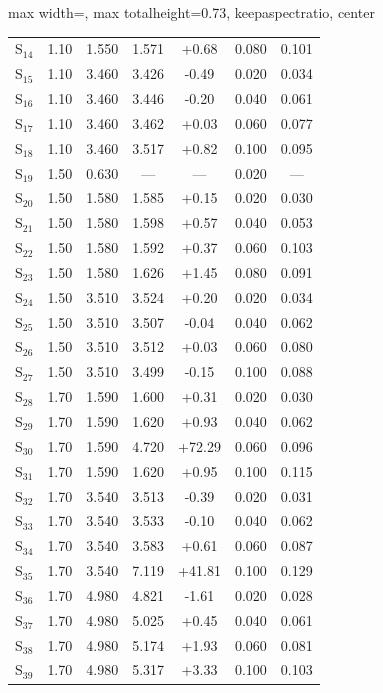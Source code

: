 \begin{adjustbox}{
max width=\textwidth,
max totalheight=0.73\textheight,
keepaspectratio,
center
}
\begin{tabular}{@{}c c c c c c c@{}}
S$_{14}$ & 1.10 & 1.550 & 1.571 & +0.68 & 0.080 & 0.101 \\
S$_{15}$ & 1.10 & 3.460 & 3.426 & -0.49 & 0.020 & 0.034 \\
S$_{16}$ & 1.10 & 3.460 & 3.446 & -0.20 & 0.040 & 0.061 \\
S$_{17}$ & 1.10 & 3.460 & 3.462 & +0.03 & 0.060 & 0.077 \\
S$_{18}$ & 1.10 & 3.460 & 3.517 & +0.82 & 0.100 & 0.095 \\
S$_{19}$ & 1.50 & 0.630 & --- & --- & 0.020 & --- \\
S$_{20}$ & 1.50 & 1.580 & 1.585 & +0.15 & 0.020 & 0.030 \\
S$_{21}$ & 1.50 & 1.580 & 1.598 & +0.57 & 0.040 & 0.053 \\
S$_{22}$ & 1.50 & 1.580 & 1.592 & +0.37 & 0.060 & 0.103 \\
S$_{23}$ & 1.50 & 1.580 & 1.626 & +1.45 & 0.080 & 0.091 \\
S$_{24}$ & 1.50 & 3.510 & 3.524 & +0.20 & 0.020 & 0.034 \\
S$_{25}$ & 1.50 & 3.510 & 3.507 & -0.04 & 0.040 & 0.062 \\
S$_{26}$ & 1.50 & 3.510 & 3.512 & +0.03 & 0.060 & 0.080 \\
S$_{27}$ & 1.50 & 3.510 & 3.499 & -0.15 & 0.100 & 0.088 \\
S$_{28}$ & 1.70 & 1.590 & 1.600 & +0.31 & 0.020 & 0.030 \\
S$_{29}$ & 1.70 & 1.590 & 1.620 & +0.93 & 0.040 & 0.062 \\
S$_{30}$ & 1.70 & 1.590 & 4.720 & +72.29 & 0.060 & 0.096 \\
S$_{31}$ & 1.70 & 1.590 & 1.620 & +0.95 & 0.100 & 0.115 \\
S$_{32}$ & 1.70 & 3.540 & 3.513 & -0.39 & 0.020 & 0.031 \\
S$_{33}$ & 1.70 & 3.540 & 3.533 & -0.10 & 0.040 & 0.062 \\
S$_{34}$ & 1.70 & 3.540 & 3.583 & +0.61 & 0.060 & 0.087 \\
S$_{35}$ & 1.70 & 3.540 & 7.119 & +41.81 & 0.100 & 0.129 \\
S$_{36}$ & 1.70 & 4.980 & 4.821 & -1.61 & 0.020 & 0.028 \\
S$_{37}$ & 1.70 & 4.980 & 5.025 & +0.45 & 0.040 & 0.061 \\
S$_{38}$ & 1.70 & 4.980 & 5.174 & +1.93 & 0.060 & 0.081 \\
S$_{39}$ & 1.70 & 4.980 & 5.317 & +3.33 & 0.100 & 0.103 \\
\bottomrule
\end{tabular}
\end{adjustbox}
\endgroup
